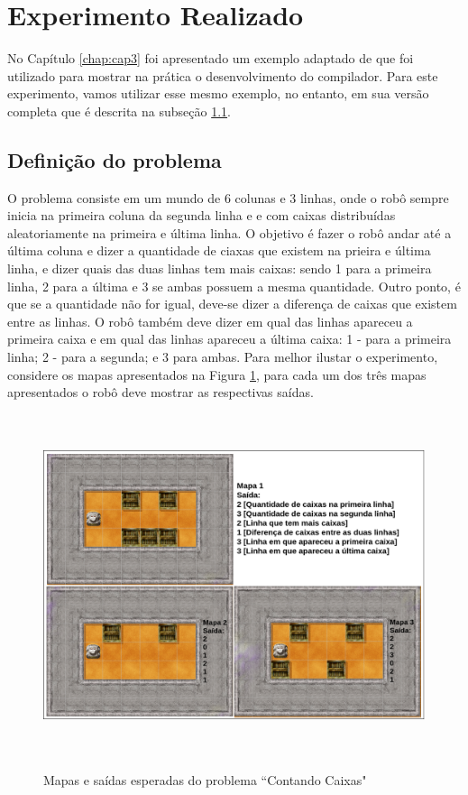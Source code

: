 \section{Experimento Realizado}
\label{sub:sec42}
No Capítulo \ref{chap:cap3} foi apresentado um exemplo adaptado de \cite{furb} que foi utilizado para mostrar na prática o desenvolvimento do compilador. Para este experimento, vamos utilizar esse mesmo exemplo, no entanto, em sua versão completa que é descrita na subseção \ref{sub:subdefprob}.

\subsection{Definição do problema}
\label{sub:subdefprob}
O problema consiste em um mundo de 6 colunas e 3 linhas, onde o robô sempre inicia na primeira coluna da segunda linha e e com caixas distribuídas aleatoriamente na primeira e última linha. O objetivo é fazer o robô andar até a última coluna e dizer a quantidade de ciaxas que existem na prieira e última linha, e dizer quais das duas linhas tem mais caixas: sendo 1 para a primeira linha, 2 para a última e 3 se ambas possuem a mesma quantidade. Outro ponto, é que se a quantidade não for igual, deve-se dizer a diferença de caixas que existem entre as linhas. O robô também deve dizer em qual das linhas apareceu a primeira caixa e em qual das linhas apareceu a última caixa: 1 - para a primeira linha; 2 - para a segunda; e 3 para ambas. Para melhor ilustar o experimento, considere os mapas apresentados na Figura \ref{fig:problem}, para cada um dos três mapas apresentados o robô deve mostrar as respectivas saídas.

\begin{figure}[h]
\centering
\caption{Mapas e saídas esperadas do problema ``Contando Caixas"}
\includegraphics[height=10cm]{figuras/problema.png}
\label{fig:problem}
\end{figure}

